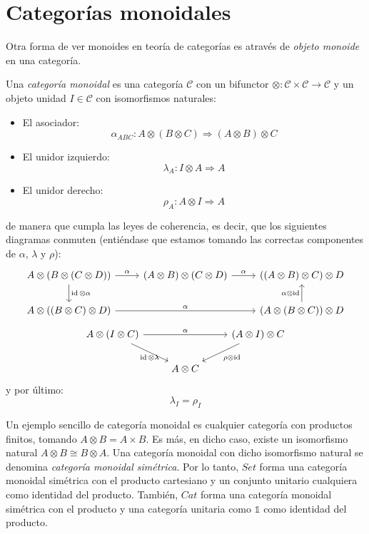 \documentclass[12pt, twoside]{book}
\newcommand{\cat}{{\mathcal{C}}}
\newcommand{\Set}{{Set}}
\newcommand{\Cat}{{Cat}}
\DeclareMathOperator{\id}{id}
\begin{document}
\section{Categorías monoidales}
Otra forma de ver monoides en teoría de categorías es através de \emph{objeto monoide} en una categoría.

\begin{definition}
Una \emph{categoría monoidal} es una categoría $\cat$ con un bifunctor $\otimes \colon \cat \times \cat \to \cat$ y un objeto unidad $I \in \cat$ con isomorfismos naturales:
\begin{itemize}
  \item El asociador:
\[ \alpha_{ABC} \colon A \otimes (B \otimes C) \Rightarrow (A \otimes B) \otimes C \]
  \item El unidor izquierdo:
\[ \lambda_A \colon I \otimes A \Rightarrow A \]
  \item El unidor derecho:
\[ \rho_A \colon A \otimes I \Rightarrow A \]
\end{itemize}
de manera que cumpla las leyes de coherencia, es decir, que los siguientes diagramas conmuten (entiéndase que estamos tomando las correctas componentes de $\alpha$, $\lambda$ y $\rho$):
\[\begin{tikzcd}
{A \otimes (B \otimes (C \otimes D))} \arrow[r,"\alpha"] \arrow[d,"\id\otimes\alpha"] & {(A \otimes B) \otimes (C \otimes D)} \arrow[r,"\alpha"] & {((A \otimes B) \otimes C) \otimes D}\\
{A \otimes ((B \otimes C) \otimes D)} \arrow[rr,"\alpha"] & & {(A \otimes (B \otimes C)) \otimes D} \arrow[u,"\alpha\otimes\id"]
\end{tikzcd}\]
\[\begin{tikzcd}
{A \otimes (I \otimes C)} \arrow[dr,"\id \otimes \lambda" below] \arrow[rr,"\alpha"] & & {(A \otimes I) \otimes C} \arrow[dl,"\rho \otimes \id"]\\
& {A \otimes C}
\end{tikzcd}\]
y por último:
\[ \lambda_I = \rho_I \]
\end{definition}

Un ejemplo sencillo de categoría monoidal es cualquier categoría con productos finitos, tomando $A \otimes B = A \times B$.
Es más, en dicho caso, existe un isomorfismo natural $A \otimes B \cong B \otimes A$.
Una categoría monoidal con dicho isomorfismo natural se denomina \emph{categoría monoidal simétrica}.
Por lo tanto, $\Set$ forma una categoría monoidal simétrica con el producto cartesiano y un conjunto unitario cualquiera como identidad del producto.
También, $\Cat$ forma una categoría monoidal simétrica con el producto y una categoría unitaria como $\mathbb{1}$ como identidad del producto.
\end{document}
